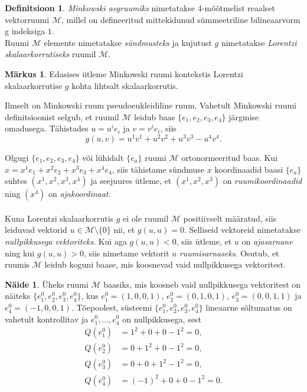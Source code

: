 \documentclass[a4paper,12pt]{article}
\theoremstyle{plain}
\theoremstyle{definition}
\newtheorem{definitsioon}{Definitsioon}[section]
\newtheorem{naide}{Näide}[section]
\newtheorem{markus}{Märkus}[section]
\numberwithin{equation}{section}
\begin{document}
\begin{definitsioon}
\emph{Minkowski aegruumiks} nimetatakse $4$-mõõtmelist reaalset vektorruumi $\mathcal{M}$, millel on defineeritud mittekidunud sümmeetriline bilineaarvorm g indeksiga $1$. \\
Ruumi $\mathcal{M}$ elemente nimetatakse \emph{sündmusteks} ja kujutust $g$ nimetatakse \emph{Lorentzi skalaarkorrutiseks} ruumil $\mathcal{M}$.
\end{definitsioon}

\begin{markus}
Edasises ütleme Minkowski ruumi kontekstis Lorentzi skalaarkorrutise $g$ kohta lihtsalt skalaarkorrutis.
\end{markus}

Ilmselt on Minkowski ruum pseudoeukleidiline ruum. Vahetult Minkowski ruumi definitsioonist selgub, et ruumil $\mathcal{M}$ leidub baas $\{e_1, e_2, e_3, e_4\}$ järgmise omadusega. Tähistades $u = u^i e_i$ ja $v = v^i e_i$, siis
\[g\left(u, v\right) = u^1 v^1 + u^2 v^2 + u^3 v^3 - u^4 v^4.\]

Olgugi $\{e_1, e_2, e_3, e_4\}$ või lühidalt $\{e_a\}$ ruumi $\mathcal{M}$ ortonormeeritud baas. 
Kui $x = x^1 e_1 + x^2 e_2 + x^3 e_3 + x^4 e_4$, siis tähistame sündmuse $x$ koordinaadid baasi $\{e_a\}$ suhtes $\left( x^1, x^2, x^3, x^4 \right)$ ja seejuures ütleme, et $\left( x^1, x^2, x^3 \right)$ on \emph{ruumikoordinaadid} ning $\left(x^4\right)$ on \emph{ajakoordinaat}.
\paragraph{}
Kuna Lorentzi skalaarkorrutis $g$ ei ole ruumil $\mathcal{M}$ positiivselt määratud, siis leiduvad vektorid $u \in \mathcal{M} \setminus \{0\}$ nii, et $g \left(u, u\right) = 0$. Selliseid vektoreid nimetatakse \emph{nullpikkusega vektoriteks}. Kui aga $g \left(u, u\right) < 0$, siis ütleme, et $u$ on \emph{ajasarnane} ning kui $g \left(u, u\right) > 0$, siis nimetame vektorit $u$ \emph{ruumisarnaseks}. Osutub, et ruumis $\mathcal{M}$ leidub koguni baase, mis koosnevad vaid nullpikkusega vektoritest.

\begin{naide}
Üheks ruumi $\mathcal{M}$ baasiks, mis koosneb vaid nullpikkusega vektoritest on näiteks $\{e_1^0, e_2^0, e_3^0, e_4^0\}$, kus $e_1^0 = \left(1, 0, 0, 1\right)$, $e_2^0 = \left(0, 1, 0, 1\right)$, $e_3^0 = \left(0, 0, 1, 1\right)$ ja $e_4^0 = \left(-1, 0, 0, 1\right).$
Tõepoolest, süsteemi $\{e_1^0, e_2^0, e_3^0, e_4^0\}$ lineaarne sõltumatus on vahetult kontrollitav ja $e_1^0, \dots, e_4^0$ on nullpikkusega, sest
\begin{align*}
Q\left(e_1^0\right) &= 1^2 + 0 + 0 - 1^2 = 0, \\
Q\left(e_2^0\right) &= 0 + 1^2 + 0 - 1^2 = 0, \\
Q\left(e_3^0\right) &= 0 + 0 + 1^2 - 1^2 = 0, \\
Q\left(e_4^0\right) &= (-1)^2 + 0 + 0 - 1^2 = 0.
\end{align*}
\end{naide}
\end{document}
